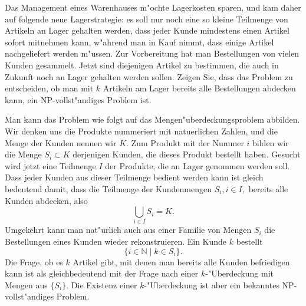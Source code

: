 Das Management eines Warenhauses m"ochte Lagerkosten sparen, und
kam daher auf folgende neue Lagerstrategie: es soll nur noch eine
so kleine Teilmenge von Artikeln an Lager gehalten werden, dass
jeder Kunde mindestens einen Artikel sofort mitnehmen kann, w"ahrend
man in Kauf nimmt, dass einige Artikel nachgeliefert werden m"ussen.
Zur Vorbereitung hat man Bestellungen von vielen Kunden gesammelt.
Jetzt sind diejenigen Artikel zu bestimmen, die auch in Zukunft
noch an Lager gehalten werden sollen. Zeigen Sie, dass das Problem
zu entscheiden, ob man mit $k$ Artikeln am Lager bereits alle
Bestellungen abdecken kann, ein NP-vollst"andiges Problem ist.

\begin{loesung}
Man kann das Problem wie folgt auf das Mengen"uberdeckungsproblem
abbilden.
Wir denken uns die Produkte nummeriert mit natuerlichen Zahlen,
und die Menge der Kunden nennen wir $K$.
Zum Produkt mit der Nummer $i$ bilden wir die Menge
$S_i\subset K$ derjenigen Kunden, die dieses Produkt bestellt haben.
Gesucht wird jetzt eine Teilmenge $I$ der Produkte, die an Lager
genommen werden soll. Dass jeder Kunden aus dieser Teilmenge
bedient werden kann ist gleich bedeutend damit, dass die Teilmenge
der Kundenmengen $S_i, i\in I,$ bereits alle Kunden abdecken, also
\[
\bigcup_{i\in I}S_i=K.
\]
Umgekehrt kann man nat"urlich auch aus einer Familie von Mengen
$S_i$ die Bestellungen eines Kunden wieder rekonstruieren. Ein
Kunde $k$ bestellt
\[
\{i\in \mathbb N\;|\;k\in S_i\}.
\]
Die Frage, ob es $k$ Artikel gibt, mit denen man bereits alle
Kunden befriedigen kann ist als gleichbedeutend mit der Frage
nach einer $k$-"Uberdeckung mit Mengen aus $\{S_i\}$. Die
Existenz einer $k$-"Uberdeckung ist aber ein bekanntes NP-vollst"andiges
Problem.
\end{loesung}
